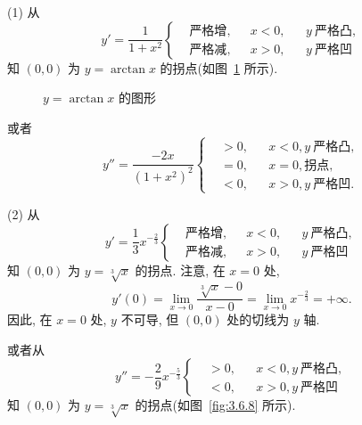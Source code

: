 \begin{solution}
(1) 从
\[
y'=\frac{1}{1+x^{2}}\left\{
\begin{aligned}
&\text{严格增}, &&x<0, &&y\ \text{严格凸},\\
&\text{严格减}, &&x>0, &&y\ \text{严格凹}
\end{aligned}\right.
\]
知 $(0,0)$ 为 $y=\arctan x$ 的拐点(如图~\ref{fig:3.6.7} 所示).

\begin{figure}[htbp]
\centering
{}
\caption{$y=\arctan x$ 的图形}\label{fig:3.6.7}
\end{figure}

或者
\[
y''=\frac{-2x}{(1+x^{2})^{2}}\left\{
\begin{aligned}
&>0, &&x<0, y\ \text{严格凸},\\
&=0, &&x=0, \text{拐点},\\
&<0, &&x>0, y\ \text{严格凹}.
\end{aligned}\right.
\]

(2) 从
\[
y'=\frac{1}{3}x^{-\frac{2}{3}}\left\{
\begin{aligned}
&\text{严格增}, &&x<0, &&y\ \text{严格凸},\\
&\text{严格减}, &&x>0, &&y\ \text{严格凹}
\end{aligned}\right.
\]
知 $(0,0)$ 为 $y=\sqrt[3]{x}$ 的拐点. 注意, 在 $x=0$ 处,
\[
y'(0)=\lim_{x\to 0}\frac{\sqrt[3]{x}-0}{x-0}=\lim_{x\to 0}x^{-\frac{2}{3}}=+\infty.
\]
因此, 在 $x=0$ 处, $y$ 不可导, 但 $(0,0)$ 处的切线为 $y$ 轴.

或者从
\[
y''=-\frac{2}{9}x^{-\frac{5}{3}}\left\{
\begin{aligned}
&>0, &&x<0, y\ \text{严格凸},\\
&<0, &&x>0, y\ \text{严格凹}
\end{aligned}\right.
\]
知 $(0,0)$ 为 $y=\sqrt[3]{x}$ 的拐点(如图~\ref{fig:3.6.8} 所示).


\end{solution}
